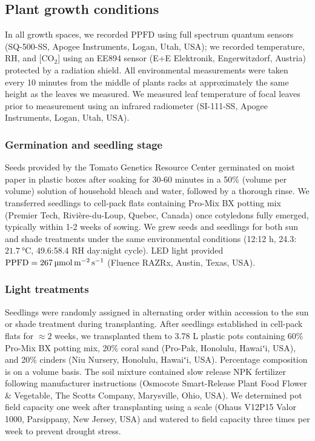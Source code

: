 \documentclass[
  letterpaper,
  DIV=11,
  numbers=noendperiod]{scrartcl}
\begin{document}
\subsection{Plant growth conditions}\label{plant-growth-conditions}

In all growth spaces, we recorded \(\mathrm{PPFD}\) using full spectrum
quantum sensors (SQ-500-SS, Apogee Instruments, Logan, Utah, USA); we
recorded temperature, RH, and {[}CO\(_2\){]} using an EE894 sensor (E+E
Elektronik, Engerwitzdorf, Austria) protected by a radiation shield. All
environmental measurements were taken every 10 minutes from the middle
of plants racks at approximately the same height as the leaves we
measured. We measured leaf temperature of focal leaves prior to
measurement using an infrared radiometer (SI-111-SS, Apogee Instruments,
Logan, Utah, USA).

\subsubsection{Germination and seedling
stage}\label{germination-and-seedling-stage}

Seeds provided by the Tomato Genetics Resource Center germinated on
moist paper in plastic boxes after soaking for 30-60 minutes in a 50\%
(volume per volume) solution of household bleach and water, followed by
a thorough rinse. We transferred seedlings to cell-pack flats containing
Pro-Mix BX potting mix (Premier Tech, Rivière-du-Loup, Quebec, Canada)
once cotyledons fully emerged, typically within 1-2 weeks of sowing. We
grew seeds and seedlings for both sun and shade treatments under the
same environmental conditions (12:12 h,
24.3:\(\qty{21.7}{\degreeCelsius}\), 49.6:58.4 RH day:night cycle). LED
light provided
\(\mathrm{PPFD} = \qty{267}{\micro\mol\raiseto{-2}\meter\raiseto{-1}\second}\)
(Fluence RAZRx, Austin, Texas, USA).

\subsubsection{Light treatments}\label{light-treatments}

Seedlings were randomly assigned in alternating order within accession
to the sun or shade treatment during transplanting. After seedlings
established in cell-pack flats for \(\approx 2\) weeks, we transplanted
them to 3.78 L plastic pots containing 60\% Pro-Mix BX potting mix, 20\%
coral sand (Pro-Pak, Honolulu, Hawaiʻi, USA), and 20\% cinders (Niu
Nursery, Honolulu, Hawaiʻi, USA). Percentage composition is on a volume
basis. The soil mixture contained slow release NPK fertilizer following
manufacturer instructions (Osmocote Smart-Release Plant Food Flower \&
Vegetable, The Scotts Company, Marysville, Ohio, USA). We determined pot
field capacity one week after transplanting using a scale (Ohaus V12P15
Valor 1000, Parsippany, New Jersey, USA) and watered to field capacity
three times per week to prevent drought stress.
\end{document}

